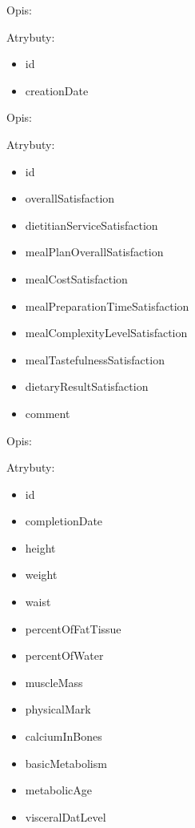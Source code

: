 \begin{enumerate}[label={\textbf{KAT/\protect\threedigits{\theenumi}}}, wide, labelwidth=!, labelindent=0pt, series=reqs]
     \label{kat:PatientCard}

    Opis: \lipsum[1]
    \par
    Atrybuty:
    \begin{itemize}
        \item id
        \item creationDate
    \end{itemize}

     \label{kat:AppointmentEvaluation}

    Opis: \lipsum[1]
    \par
    Atrybuty:
    \begin{itemize}
        \item id
        \item overallSatisfaction
        \item dietitianServiceSatisfaction
        \item mealPlanOverallSatisfaction
        \item mealCostSatisfaction
        \item mealPreparationTimeSatisfaction
        \item mealComplexityLevelSatisfaction
        \item mealTastefulnessSatisfaction
        \item dietaryResultSatisfaction
        \item comment
    \end{itemize}

     \label{kat:BodyMeasurement}

    Opis: \lipsum[1]
    \par
    Atrybuty:
    \begin{itemize}
        \item id
        \item completionDate
        \item height
        \item weight
        \item waist
        \item percentOfFatTissue
        \item percentOfWater
        \item muscleMass
        \item physicalMark
        \item calciumInBones
        \item basicMetabolism
        \item metabolicAge
        \item visceralDatLevel
    \end{itemize}


\end{enumerate}

